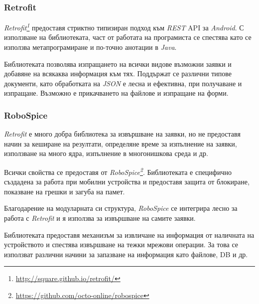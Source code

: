 		\subsubsection{Retrofit}
		
		\emph{Retrofit\footnote{\url{http://square.github.io/retrofit/}}} предоставя стриктно типизиран подход към \emph{REST} \ac{API} за \emph{Android}. С използване на библиотеката, част от работата на програмиста се спестява като се използва метапрограмиране и по-точно анотации в \emph{Java}.
		
		Библиотеката позволява изпращането на всички видове възможни заявки и добавяне на всякаква информация към тях. Поддържат се различни типове документи, като обработката на \emph{JSON} е лесна и ефективна, при получаване и изпращане. Възможно е прикачването на файлове и изпращане на форми.
		
		\subsubsection{RoboSpice}
		
		\emph{Retrofit} е много добра библиотека за извършване на заявки, но не предоставя начин за кеширане на резултати, определяне време за изпълнение на заявки, използване на много ядра, изпълнение в многонишкова среда и др.
		
		Всички свойства се предоставя от \emph{RoboSpice\footnote{\url{https://github.com/octo-online/robospice}}}. Библиотеката е специфично създадена за работа при мобилни устройства и предоставя защита от блокиране, показване на грешки и загуба на памет.
		
		Благодарение на модуларната си структура, \emph{RoboSpice} се интегрира лесно за работа с \emph{Retrofit} и я използва за извършване на самите заявки.
		
		Библиотеката предоставя механизъм за извличане на информация от наличната на устройството и спестява извършване на тежки мрежови операции. За това се използват различни начини за запазване на информация като файлове, \ac{DB} и др.
